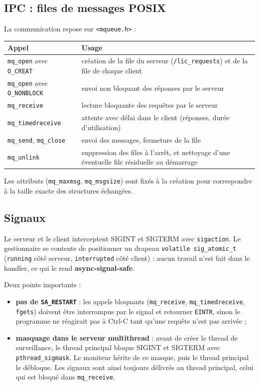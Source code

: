 \documentclass[11pt,a4paper]{article}
\newcommand{\code}[1]{\texttt{#1}}
\begin{document}
\subsection{IPC : files de messages POSIX}

La communication repose sur \code{<mqueue.h>} :

\medskip
\begin{tabularx}{\textwidth}{@{}>{\raggedright\arraybackslash}p{4.6cm}Y@{}}
\toprule
\textbf{Appel} & \textbf{Usage}\\
\midrule
\code{mq\_open} avec \code{O\_CREAT} & création de la file du serveur (\code{/lic\_requests}) et de la file de chaque client\\
\code{mq\_open} avec \code{O\_NONBLOCK} & envoi non bloquant des réponses par le serveur\\
\code{mq\_receive} & lecture bloquante des requêtes par le serveur\\
\code{mq\_timedreceive} & attente avec délai dans le client (réponses, durée d'utilisation)\\
\code{mq\_send}, \code{mq\_close} & envoi des messages, fermeture de la file\\
\code{mq\_unlink} & suppression des files à l'arrêt, et nettoyage d'une éventuelle file résiduelle au démarrage\\
\bottomrule
\end{tabularx}
\medskip

Les attributs (\code{mq\_maxmsg}, \code{mq\_msgsize}) sont fixés à la création pour correspondre à la taille exacte des structures échangées.

\subsection{Signaux}

Le serveur et le client interceptent SIGINT et SIGTERM avec \code{sigaction}. Le gestionnaire se contente de positionner un drapeau \code{volatile sig\_atomic\_t} (\code{running} côté serveur, \code{interrupted} côté client) : aucun travail n'est fait dans le handler, ce qui le rend \textbf{async-signal-safe}.

Deux points importants :
\begin{itemize}
  \item \textbf{pas de \code{SA\_RESTART}} : les appels bloquants (\code{mq\_receive}, \code{mq\_timedreceive}, \code{fgets}) doivent être interrompus par le signal et retourner \code{EINTR}, sinon le programme ne réagirait pas à Ctrl-C tant qu'une requête n'est pas arrivée ;
  \item \textbf{masquage dans le serveur multithread} : avant de créer le thread de surveillance, le thread principal bloque SIGINT et SIGTERM avec \code{pthread\_sigmask}. Le moniteur hérite de ce masque, puis le thread principal le débloque. Les signaux sont ainsi toujours délivrés au thread principal, celui qui est bloqué dans \code{mq\_receive}.
\end{itemize}
\end{document}
